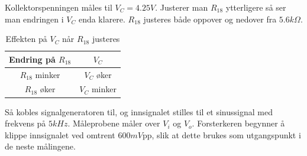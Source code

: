             Kollektorspenningen måles til $V_C = 4.25V$. Justerer man $R_{18}$ ytterligere så ser man endringen i $V_C$ enda klarere. $R_{18}$ justeres både oppover og nedover fra $5.6k\Omega$.
            \begin{table}[H]
                \centering
                \caption{Effekten på $V_C$ når $R_{18}$ justeres}
                \label{tab:kollektormostand2}
                \begin{tabular}{|c|c|}
                    \hline
                    \rowcolor[gray]{0.9}
                    \textbf{Endring på $R_{18}$} & \textbf{$V_C$} \\ \hline
                    $R_{18}$ minker & $V_C$ øker \\ \hline 
                    $R_{18}$ øker & $V_C$ minker \\ \hline
                \end{tabular}
            \end{table}

            Så kobles signalgeneratoren til, og innsignalet stilles til et sinussignal med  frekvens på $5kHz$. Måleprobene måler over $V_i$ og $V_o$. Forsterkeren begynner å klippe innsignalet ved omtrent $600mV$pp, slik at dette brukes som utgangspunkt i de neste målingene. 
            
